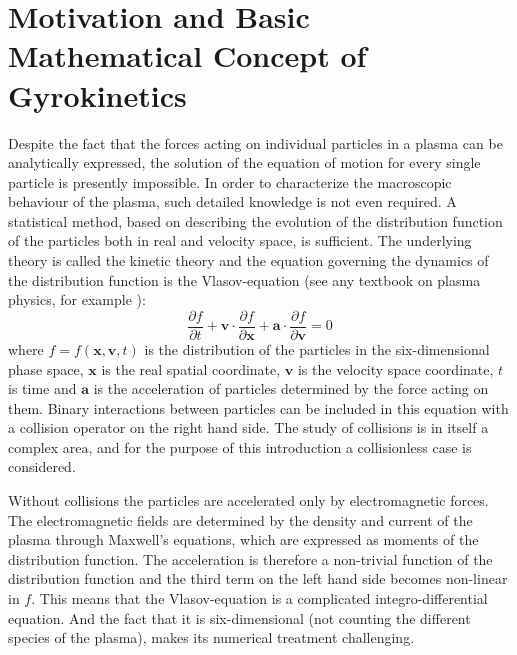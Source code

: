 \documentclass[a4paper,10pt]{article}
\newcommand{\dpt}[1]{\frac{\partial #1}{\partial t}}
\renewcommand{\vec}[1]{\mathbf{#1}}
\begin{document}
\section{Motivation and Basic Mathematical Concept of Gyrokinetics} \label{sec:gk_concept}
Despite the fact that the forces acting on individual particles in a plasma can be analytically expressed, the solution of the equation of motion for every single particle is presently impossible. In order to characterize the macroscopic behaviour of the plasma, such detailed knowledge is not even required. A statistical method, based on describing the evolution of the distribution function of the particles both in real and velocity space, is sufficient. The underlying theory is called the kinetic theory and the equation governing the dynamics of the distribution function is the Vlasov-equation (see any textbook on plasma physics, for example \cite{bellan}):
\begin{equation}
 \dpt{f} + \vec{v} \cdot \frac{\partial f}{\partial \vec{x}} + \vec{a} \cdot \frac{\partial f}{\partial \vec{v}} = 0
 \label{eq:vlasov_basic}
\end{equation}
where $f=f(\vec{x},\vec{v},t)$ is the distribution of the particles in the six-dimensional phase space, $\vec{x}$ is the real spatial coordinate, $\vec{v}$ is the velocity space coordinate, $t$ is time and $\vec{a}$ is the acceleration of particles determined by the force acting on them. Binary interactions between particles can be included in this equation with a collision operator on the right hand side. The study of collisions is in itself a complex area, and for the purpose of this introduction a collisionless case is considered.

Without collisions the particles are accelerated only by electromagnetic forces. The electromagnetic fields are determined by the density and current of the plasma through Maxwell's equations, which are expressed as moments of the distribution function. The acceleration is therefore a non-trivial function of the distribution function and the third term on the left hand side becomes non-linear in $f$. This means that the Vlasov-equation is a complicated integro-differential equation. And the fact that it is six-dimensional (not counting the different species of the plasma), makes its numerical treatment challenging. 
\end{document}
